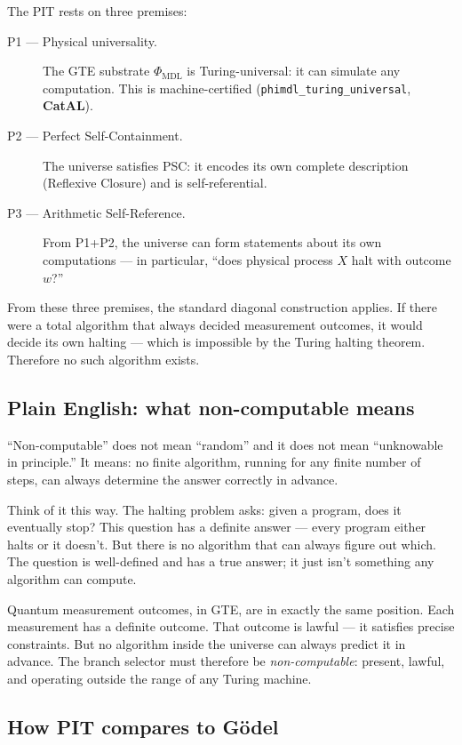 \documentclass[11pt,a4paper]{article}
\newcommand{\lean}[1]{\texttt{#1}}
\newcommand{\PHIMDL}{\Phi_{\mathrm{MDL}}}
\newcommand{\CatAL}{\textbf{CatAL}}
\begin{document}
The PIT rests on three premises:

\begin{description}
  \item[P1 --- Physical universality.]  The GTE substrate $\PHIMDL$ is
    Turing-universal: it can simulate any computation.  This is machine-certified
    (\lean{phimdl\_turing\_universal}, \CatAL).
  \item[P2 --- Perfect Self-Containment.]  The universe satisfies PSC: it encodes
    its own complete description (Reflexive Closure) and is self-referential.
  \item[P3 --- Arithmetic Self-Reference.]  From P1+P2, the universe can form
    statements about its own computations --- in particular, ``does physical
    process $X$ halt with outcome $w$?''
\end{description}

From these three premises, the standard diagonal construction applies.  If there
were a total algorithm that always decided measurement outcomes, it would decide
its own halting --- which is impossible by the Turing halting theorem.  Therefore
no such algorithm exists.

\subsection{Plain English: what non-computable means}

``Non-computable'' does not mean ``random'' and it does not mean ``unknowable in
principle.''  It means: no finite algorithm, running for any finite number of steps,
can always determine the answer correctly in advance.

Think of it this way.  The halting problem asks: given a program, does it eventually
stop?  This question has a definite answer --- every program either halts or it
doesn't.  But there is no algorithm that can always figure out which.  The question
is well-defined and has a true answer; it just isn't something any algorithm can
compute.

Quantum measurement outcomes, in GTE, are in exactly the same position.  Each
measurement has a definite outcome.  That outcome is lawful --- it satisfies precise
constraints.  But no algorithm inside the universe can always predict it in advance.
The branch selector must therefore be \emph{non-computable}: present, lawful, and
operating outside the range of any Turing machine.

\subsection{How PIT compares to G\"{o}del}
\end{document}
